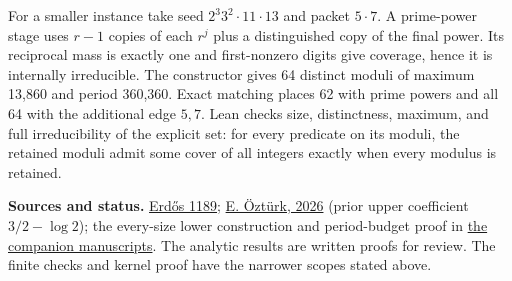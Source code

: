 \documentclass[11pt]{article}
\begin{document}
For a smaller instance take seed $2^3 3^2\cdot11\cdot13$ and packet $5\cdot7$. A prime-power stage uses $r-1$ copies of each $r^j$ plus a distinguished copy of the final power. Its reciprocal mass is exactly one and first-nonzero digits give coverage, hence it is internally irreducible. The constructor gives 64 distinct moduli of maximum 13,860 and period 360,360. Exact matching places 62 with prime powers and all 64 with the additional edge $5,7$. Lean checks size, distinctness, maximum, and full irreducibility of the explicit set: for every predicate on its moduli, the retained moduli admit some cover of all integers exactly when every modulus is retained.

{\small\textbf{Sources and status.} \href{https://www.erdosproblems.com/1189}{Erd\H os 1189}; \href{https://doi.org/10.13140/RG.2.2.16138.63684}{E. \"Ozt\"urk, 2026} (prior upper coefficient $3/2-\log 2$); the every-size lower construction and period-budget proof in \href{https://github.com/jpollard-cs/open-math-agents/pull/1}{the companion manuscripts}. The analytic results are written proofs for review. The finite checks and kernel proof have the narrower scopes stated above.}



\end{document}
